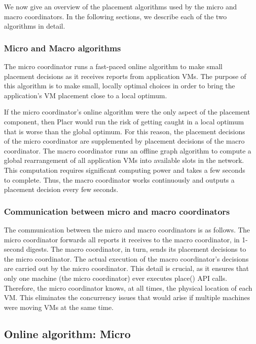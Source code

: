 \documentclass[11pt]{article}
\begin{document}
We now give an overview of the placement algorithms used by the micro and macro coordinators.  In the following sections, we describe each of the two algorithms in detail.

\subsubsection{Micro and Macro algorithms}

The micro coordinator runs a fast-paced online algorithm to make small placement decisions as it receives reports from application VMs.  The purpose of this algorithm is to make small, locally optimal choices in order to bring the application’s VM placement close to a local optimum.

If the micro coordinator’s online algorithm were the only aspect of the placement component, then Placr would run the risk of getting caught in a local optimum that is worse than the global optimum.  For this reason, the placement decisions of the micro coordinator are supplemented by placement decisions of the macro coordinator.  The macro coordinator runs an offline graph algorithm to compute a global rearrangement of all application VMs into available slots in the network.  This computation requires significant computing power and takes a few seconds to complete.  Thus, the macro coordinator works continuously and outputs a placement decision every few seconds.

\subsubsection{Communication between micro and macro coordinators}

The communication between the micro and macro coordinators is as follows.  The micro coordinator forwards all reports it receives to the macro coordinator, in 1-second digests.  The macro coordinator, in turn, sends its placement decisions to the micro coordinator.  The actual execution of the macro coordinator’s decisions are carried out by the micro coordinator.  This detail is crucial, as it ensures that only one machine (the micro coordinator) ever executes place() API calls.  Therefore, the micro coordinator knows, at all times, the physical location of each VM.  This eliminates the concurrency issues that would arise if multiple machines were moving VMs at the same time.

\subsection{Online algorithm: Micro}
\end{document}
